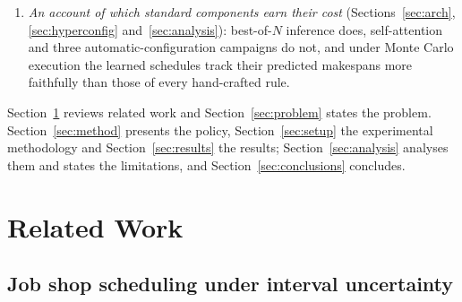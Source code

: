 \documentclass[preprint,12pt]{elsarticle}
\theoremstyle{definition}
\theoremstyle{remark}
\begin{document}
\begin{enumerate}
  contribute is settled empirically rather than assumed. Its
  examination on the trained policy: a permutation
  audit and two retraining ablations that probe the widths as inputs,
  whose effect on unseen instances is bounded within a third of a
  point either way, and the intervals as training data. And the contrast between the paradigms: a width-penalizing
  objective narrows the policy's schedules mainly through sample
  selection, no systematic narrowing surviving a common selection
  criterion, and acts through the evolved representation in the GP
  study~\citep{DiazGP2026}.
\item \emph{An account of which standard components earn their cost}
  (Sections~\ref{sec:arch}, \ref{sec:hyperconfig}
  and~\ref{sec:analysis}): best-of-$N$ inference does,
  self-attention and three automatic-configuration campaigns do not,
  and under Monte Carlo execution the learned schedules track their
  predicted makespans more faithfully than those of every
  hand-crafted rule.
\end{enumerate}

Section~\ref{sec:related} reviews related work and
Section~\ref{sec:problem} states the problem.
Section~\ref{sec:method} presents the policy,
Section~\ref{sec:setup} the experimental methodology and
Section~\ref{sec:results} the results;
Section~\ref{sec:analysis} analyses them and states the limitations,
and Section~\ref{sec:conclusions} concludes.

\section{Related Work}
\label{sec:related}

\subsection{Job shop scheduling under interval uncertainty}
\end{document}
